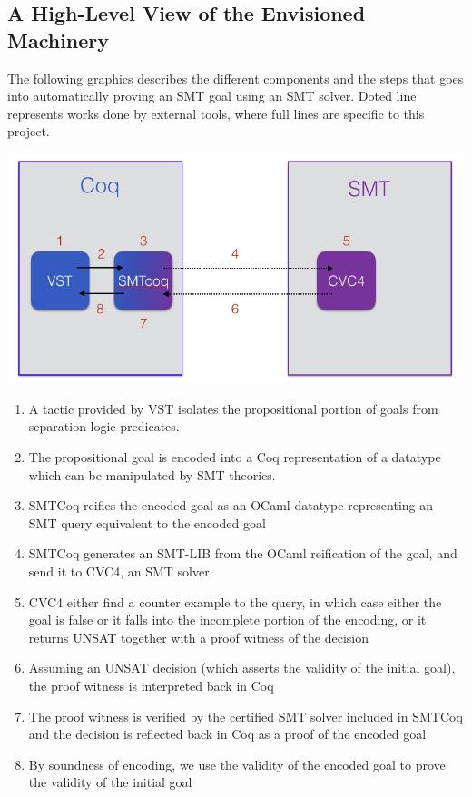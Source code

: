 \documentclass[onecolumn, preprint]{sigplanconf}
\begin{document}
\subsection{A High-Level View of the Envisioned Machinery}
The following graphics describes the different components and the steps that goes into automatically proving an SMT goal using an SMT solver. Doted line represents works done by external tools, where full lines are specific to this project. 
\begin{center}
\includegraphics[scale=0.5]{pictures/arch.png}
\end{center}


\begin{enumerate}
\item %
  A tactic provided by VST isolates the propositional portion of goals from separation-logic predicates.
\item %
  The propositional goal is encoded into a Coq representation of a datatype which can be manipulated by SMT theories.
  
\item %
 SMTCoq reifies the encoded goal as an OCaml datatype representing an SMT query equivalent to the encoded goal
  
\item %
  SMTCoq generates an SMT-LIB from the OCaml reification of the goal, and send it to CVC4, an SMT solver
  
\item %
  CVC4 either find a counter example to the query, in which case either the goal is false or it falls into the incomplete portion of the encoding, or it returns UNSAT together with a proof witness of the decision
  
\item %
  Assuming an UNSAT decision (which asserts the validity of the initial goal), the proof witness is interpreted back in Coq 
  
  
\item %
  The proof witness is verified by the certified SMT solver included in SMTCoq and the decision is reflected back in Coq as a proof of the encoded goal
  
\item %
  By soundness of encoding, we use the validity of the encoded goal to prove the validity of the initial goal

  
\end{enumerate}
\end{document}
